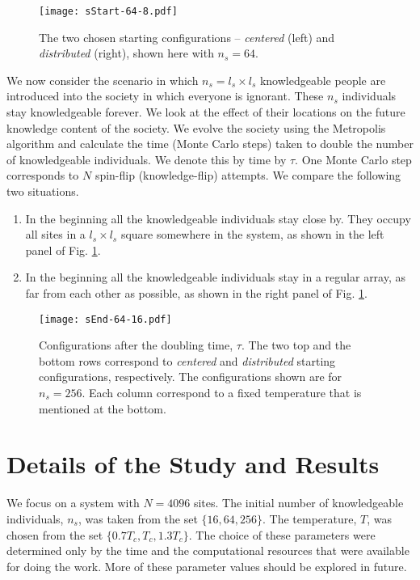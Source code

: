 \documentclass[a4paper,12pt]{article}
\begin{document}
\begin{figure}
  \centering
  \texttt{[image: sStart-64-8.pdf]}
  \caption{The two chosen starting configurations --
    {\em centered} (left) and {\em distributed}
    (right), shown here with $n_s=64$.}
  \label{starts}
\end{figure}

We now consider the scenario in which $n_s=l_s\times l_s$ knowledgeable people are
introduced into the society in which everyone is ignorant.
These $n_s$ individuals stay knowledgeable forever.
We look at the effect of their locations on the future knowledge
content of the society.
We evolve the society using the Metropolis algorithm and calculate the time (Monte
Carlo steps) taken to double the number of knowledgeable individuals.
We denote this by time by $\tau$.
One Monte Carlo step corresponds to $N$ spin-flip (knowledge-flip) attempts.
We compare the following two situations.
\begin{enumerate}
\item In the beginning all the knowledgeable individuals stay close by. They occupy all sites in a
  $l_s\times l_s$ square somewhere in the system, as shown in the left panel of Fig. \ref{starts}.
\item In the beginning all the knowledgeable individuals stay in a regular array,
  as far from each other as possible, as shown in the right panel of Fig. \ref{starts}.
\end{enumerate}

\begin{figure}
  \centering
  \texttt{[image: sEnd-64-16.pdf]}
  \caption{
    Configurations after the doubling time, $\tau$.
    The two top and the bottom rows correspond to
    {\em centered} and {\em distributed}
    starting configurations, respectively.
    The configurations shown are for $n_s=256$.
    Each column correspond to a fixed temperature that is
    mentioned at the bottom.
  }
  \label{sends}
\end{figure}


\section{Details of the Study and Results}
We focus on a system with $N=4096$ sites.
The initial number of knowledgeable individuals, $n_s$, was taken from the set $\{16,64,256\}$.
The temperature, $T$, was chosen from the set $\{0.7T_c, T_c, 1.3T_c\}$.
The choice of these parameters were determined only by the time and the computational
resources that were available for doing the work. More of these parameter values
should be explored in future.
\end{document}
